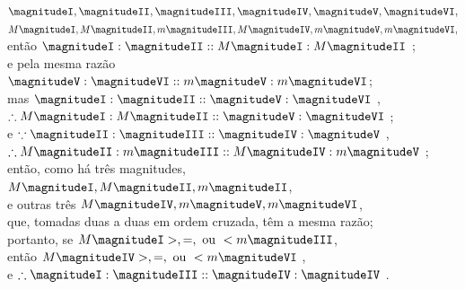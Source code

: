 \documentclass[booklanguage=brazilian]{byrnebook}
\begin{document}
\begin{center}
$\magnitudeI, \magnitudeII, \magnitudeIII, \magnitudeIV, \magnitudeV, \magnitudeVI,$\\
$M \magnitudeI, M \magnitudeII, m \magnitudeIII, M \magnitudeIV, m \magnitudeV, m \magnitudeVI,$\\
então $\magnitudeI : \magnitudeII :: M \magnitudeI : M \magnitudeII$ ;\\
e pela mesma razão\\
$\magnitudeV : \magnitudeVI :: m \magnitudeV : m \magnitudeVI$;\\
mas $\magnitudeI : \magnitudeII :: \magnitudeV : \magnitudeVI$ \byref{\hypref},\\
$\therefore M \magnitudeI : M \magnitudeII :: \magnitudeV : \magnitudeVI$ ;\\
e $\because \magnitudeII : \magnitudeIII :: \magnitudeIV : \magnitudeV$ \byref{\hypref},\\
$\therefore M \magnitudeII : m \magnitudeIII :: M \magnitudeIV : m \magnitudeV$ ;\\
então, como há três magnitudes,\\
$M \magnitudeI, M \magnitudeII, m \magnitudeII$,\\
e outras três $M \magnitudeIV, m \magnitudeV, m \magnitudeVI$,\\
que, tomadas duas a duas em ordem cruzada, têm a mesma razão;\\
portanto, se $M \magnitudeI >, =, \mbox{ ou } < m \magnitudeIII$,\\
então $M \magnitudeIV >, =, \mbox{ ou } < m \magnitudeVI$ ,\\
e $\therefore \magnitudeI : \magnitudeIII :: \magnitudeIV : \magnitudeIV$ .


\end{center}
\end{document}
